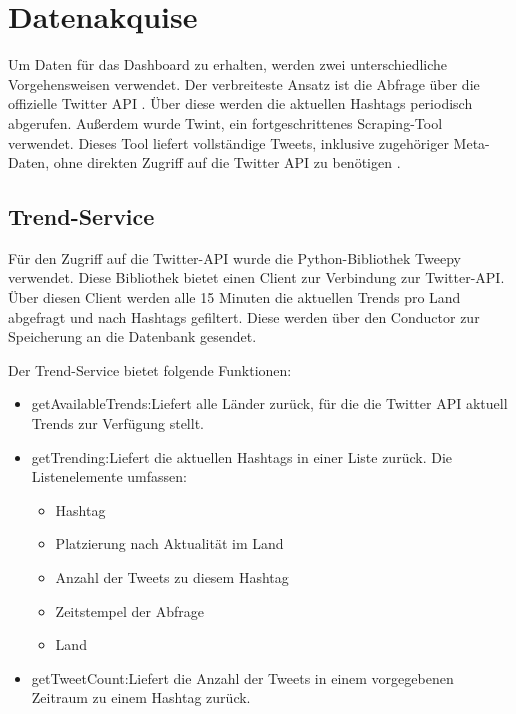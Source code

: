 \documentclass[conference]{IEEEtran}
\begin{document}


\section{Datenakquise}
Um Daten für das Dashboard zu erhalten, werden zwei unterschiedliche Vorgehensweisen verwendet.
Der verbreiteste Ansatz ist die Abfrage über die offizielle Twitter API \cite{twitterapi}.
Über diese werden die aktuellen Hashtags periodisch abgerufen.
Außerdem wurde Twint, ein fortgeschrittenes Scraping-Tool verwendet.
Dieses Tool liefert vollständige Tweets, inklusive zugehöriger Meta-Daten,
ohne direkten Zugriff auf die Twitter API zu benötigen \cite{twint}.

\subsection*{Trend-Service}
Für den Zugriff auf die Twitter-API wurde die Python-Bibliothek Tweepy \cite{tweepy} verwendet.
Diese Bibliothek bietet einen Client zur Verbindung zur Twitter-API.
Über diesen Client werden alle 15 Minuten die aktuellen Trends pro Land abgefragt und nach Hashtags gefiltert.
Diese werden über den Conductor zur Speicherung an die Datenbank gesendet.

Der Trend-Service bietet folgende Funktionen:
\begin{itemize}

    \item getAvailableTrends:\newline Liefert alle Länder zurück, für die die Twitter API aktuell Trends zur Verfügung stellt.
    \item getTrending:\newline Liefert die aktuellen Hashtags in einer Liste zurück. Die Listenelemente umfassen:
          \begin{itemize}
              \item Hashtag
              \item Platzierung nach Aktualität im Land
              \item Anzahl der Tweets zu diesem Hashtag
              \item Zeitstempel der Abfrage
              \item Land
          \end{itemize}
    \item getTweetCount:\newline Liefert die Anzahl der Tweets in einem vorgegebenen Zeitraum zu einem Hashtag zurück.

\end{itemize}
\end{document}
